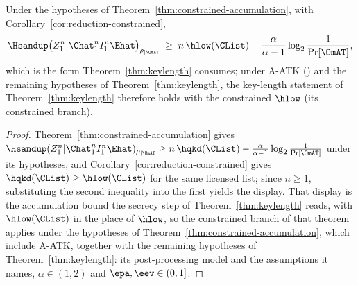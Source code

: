 
\begin{corollary}
\label{cor:constrained-key-length}
Under the hypotheses of Theorem~\ref{thm:constrained-accumulation}, with
Corollary~\ref{cor:reduction-constrained},
\begin{equation*}
  \Hsandup\big(Z_1^n\big|\Chat_1^nI_1^n\Ehat\big)_{\rho_{|\OmAT}}
  \;\ge\;n\,\hlow(\CList)
  -\frac{\alpha}{\alpha-1}\log_2\frac{1}{\Pr[\OmAT]},
\end{equation*}
which is the form Theorem~\ref{thm:keylength} consumes; under
A-ATK () and the remaining
hypotheses of Theorem~\ref{thm:keylength}, the key-length statement
of Theorem~\ref{thm:keylength} therefore holds with the constrained $\hlow$
(its constrained branch).
\end{corollary}

\begin{proof}
Theorem~\ref{thm:constrained-accumulation} gives
$\Hsandup(Z_1^n|\Chat_1^nI_1^n\Ehat)_{\rho_{|\OmAT}}
\ge n\,\hqkd(\CList)-\frac{\alpha}{\alpha-1}\log_2\frac{1}{\Pr[\OmAT]}$
under its hypotheses, and Corollary~\ref{cor:reduction-constrained} gives
$\hqkd(\CList)\ge\hlow(\CList)$ for the same licensed list; since $n\ge1$,
substituting the second inequality into the first yields the display. That
display is the accumulation bound the secrecy step of
Theorem~\ref{thm:keylength} reads, with $\hlow(\CList)$ in the place of
$\hlow$, so the constrained branch of that theorem applies under the
hypotheses of Theorem~\ref{thm:constrained-accumulation}, which include A-ATK,
together with the remaining hypotheses of Theorem~\ref{thm:keylength}: its
post-processing model and the assumptions it names, $\alpha\in(1,2)$ and
$\epa,\eev\in(0,1]$.
\end{proof}

